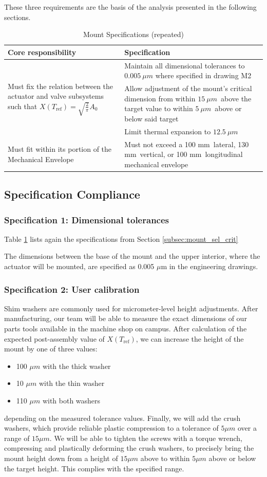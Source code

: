 \documentclass[12pt, letterpaper]{report}%
\newcounter{mycounter}           %
\newcounter{sub}[mycounter]      %
\newcommand{\mountdLTol}{$12.5\ \mu m$}
\newcommand{\calRange}{$15\ \mu m$}
\newcommand{\calTol}{$5\ \mu m$}
\newcommand{\mountMEX}{100 mm}
\newcommand{\mountMEY}{130 mm}
\newcommand{\mountMEZ}{100 mm}
\newcommand{\mountSpecs}
{%
    \renewcommand{\arraystretch}{1.4}
    \begin{tabular}{|m{0.45\textwidth}|m{0.5\textwidth}|}
    
        \hline
        \textbf{Core responsibility} & \textbf{Specification} \\ \hline

        \multirow[c]{3}{0.45\textwidth}{Must fix the relation between the actuator and valve subsystems such that $X(T_{\text{ref}}) = \sqrt{\frac{2}{\pi}} A_0$}
        &
        Maintain all dimensional tolerances to $0.005\ \mu m$ where specified in drawing M2
        \\ \cline{2-2}
        &
        Allow adjustment of the mount's critical dimension from within \calRange\ above the target value to within \calTol\ above or below said target
        \\ \cline{2-2}
        &
        Limit thermal expansion to \mountdLTol \\ \hline

        Must fit within its portion of the Mechanical Envelope
        &
        Must not exceed a \mountMEX\ lateral, \mountMEY\ vertical, or \mountMEZ\ longitudinal mechanical envelope \\
        \hline

    \end{tabular}
}
\begin{document}
            These three requirements are the basis of the analysis presented in the following sections.

        

        \begin{table}[H]
            \centering
            \caption{Mount Specifications (repeated)}
            \mountSpecs
            \label{tab:mount_specs_disc}
        \end{table}
        \subsection{Specification Compliance}
        \subsubsection{Specification 1: Dimensional tolerances}
        \label{subsec:mount_spec_1}

        Table \ref{tab:mount_specs_disc} lists again the specifications from Section \ref{subsec:mount_sel_crit}

            The dimensions between the base of the mount and the upper interior, where the actuator will be mounted, are specified as 0.005 $\mu$m in the engineering drawings.

        \subsubsection{Specification 2: User calibration}
        \label{subsec:mount_spec_2}

            Shim washers are commonly used for micrometer-level height adjustments. After manufacturing, our team will be able to measure the exact dimensions of our parts tools available in the machine shop on campus.
            After calculation of the expected post-assembly value of $X(T_{\text{ref}})$, we can increase the height of the mount by one of three values:

            \begin{itemize}
                \item 100 $\mu m$ with the thick washer
                \item 10 $\mu m$ with the thin washer
                \item 110 $\mu m$ with both washers
            \end{itemize}

            depending on the measured tolerance values. Finally, we will add the crush washers, which provide reliable plastic compression to a tolerance of $5 \mu m$ over a range of $15 \mu m$.
            We will be able to tighten the screws with a torque wrench, compressing and plastically deforming the crush washers, to precisely bring the mount height down from a height of $15 \mu m$ above to within $5 \mu m$ above or below the target height. This complies with the specified range. 
\end{document}
